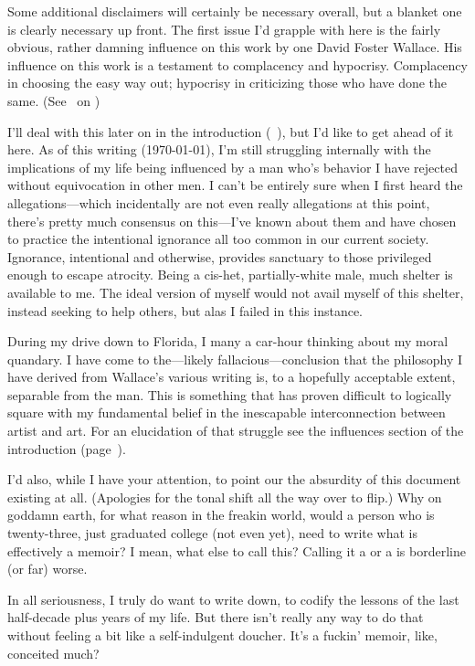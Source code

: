 \vspace*{\fill}
{\normalsize Some additional disclaimers will certainly be necessary overall, but a blanket one is clearly necessary up front.
The first issue I'd grapple with here is the fairly obvious, rather damning influence on this work by one David Foster Wallace.
His influence on this work is a testament to complacency and hypocrisy.
Complacency in choosing the easy way out; hypocrisy in criticizing those who have done the same.
(See~ on )

I'll deal with this later on in the introduction (~), but I'd like to get ahead of it here.
As of this writing (\today), I'm still struggling internally with the implications of my life being influenced by a man who's behavior I have rejected without equivocation in other men.
I can't be entirely sure when I first heard the allegations---which incidentally are not even really allegations at this point, there's pretty much consensus on this---I've known about them and have chosen to practice the intentional ignorance all too common in our current society.
Ignorance, intentional and otherwise, provides sanctuary to those privileged enough to escape atrocity.
Being a cis-het, partially-white male, much shelter is available to me.
The ideal version of myself would not avail myself of this shelter, instead seeking to help others, but alas I failed in this instance.

During my drive down to Florida, I many a car-hour thinking about my moral quandary.
I have come to the---likely fallacious---conclusion that the philosophy I have derived from Wallace's various writing is, to a hopefully acceptable extent, separable from the man.
This is something that has proven difficult to logically square with my fundamental belief in the inescapable interconnection between artist and art.
For an elucidation of that struggle see the influences section of the introduction (page~\pageref{sec:influences}).

I'd also, while I have your attention, to point our the absurdity of this document existing at all.
(Apologies for the tonal shift all the way over to flip.)
Why on goddamn earth, for what reason in the freakin world, would a person who is twenty-three, just graduated college (not even yet), need to write what is effectively a memoir?
I mean, what else to call this?
Calling it a  or a  is borderline (or far) worse.

In all seriousness, I truly do want to write down, to codify the lessons of the last half-decade plus years of my life.
But there isn't really any way to do that without feeling a bit like a self-indulgent doucher.
It's a fuckin' memoir, like, conceited much?}


